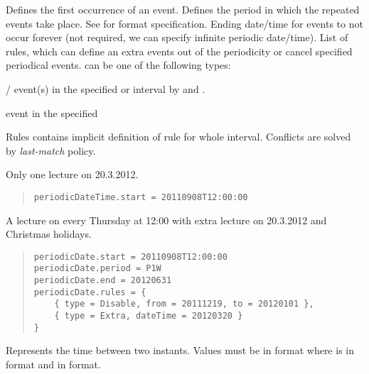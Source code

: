 \begin{Api}
\begin{ApiClassAttributes}
Defines the first occurrence of an event.
Defines the period in which the repeated events take place. See  for format specification.
Ending date/time for events to not occur forever (not required, we can specify infinite periodic date/time).
List of rules, which can define an extra events out of the periodicity or cancel specified periodical events.  can be one of the following types:
\begin{compactitem}
\item {}/ event(s) in the specified  or interval by  and .
\item {} event in the specified 
\end{compactitem}
Rules contains implicit definition of  rule for whole  interval. Conflicts are solved by \emph{last-match} policy.
\end{ApiClassAttributes}

\ApiExample Only one lecture on 20.3.2012.
\begin{quote}
\begin{verbatim}
periodicDateTime.start = 20110908T12:00:00
\end{verbatim}
\end{quote}

\ApiExample A lecture on every Thursday at 12:00 with extra lecture on 20.3.2012 and Christmas holidays.
\begin{quote}
\begin{verbatim}
periodicDate.start = 20110908T12:00:00
periodicDate.period = P1W
periodicDate.end = 20120631
periodicDate.rules = {
    { type = Disable, from = 20111219, to = 20120101 },
    { type = Extra, dateTime = 20120320 }
}
\end{verbatim}
\end{quote}

Represents the time between two instants. Values must be in format  where  is in  format and  in  format.

\end{Api}


